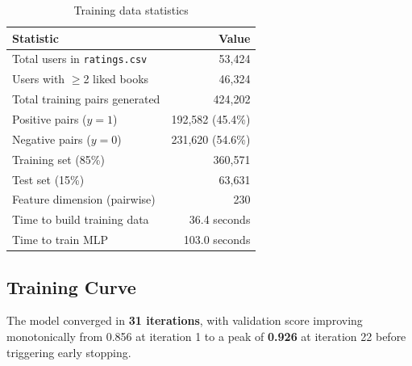 \documentclass[12pt, a4paper]{article}
\newcommand{\code}[1]{\texttt{\small\color{shelfPurple}#1}}
\begin{document}
\begin{table}[H]
\centering
\caption{Training data statistics}
\begin{tabular}{@{}lr@{}}
\toprule
\textbf{Statistic} & \textbf{Value} \\
\midrule
Total users in \code{ratings.csv} & 53{,}424 \\
Users with $\geq$2 liked books & 46{,}324 \\
Total training pairs generated & 424{,}202 \\
Positive pairs ($y=1$) & 192{,}582 (45.4\%) \\
Negative pairs ($y=0$) & 231{,}620 (54.6\%) \\
\midrule
Training set (85\%) & 360{,}571 \\
Test set (15\%) & 63{,}631 \\
\midrule
Feature dimension (pairwise) & 230 \\
Time to build training data & 36.4 seconds \\
Time to train MLP & 103.0 seconds \\
\bottomrule
\end{tabular}
\end{table}

\subsection{Training Curve}

The model converged in \textbf{31 iterations}, with validation score improving
monotonically from 0.856 at iteration 1 to a peak of \textbf{0.926} at
iteration 22 before triggering early stopping.
\end{document}
